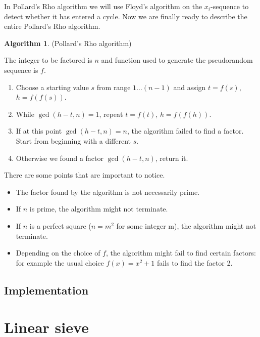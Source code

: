 \documentclass[12pt] {article}
\theoremstyle{plain}
\theoremstyle{definition}
\newtheorem{algo}[thm]{Algorithm}
\begin{document}
In Pollard's Rho algorithm we will use Floyd's algorithm on the $x_i$-sequence to detect whether it has entered a cycle. Now we are finally ready to describe the entire Pollard's Rho algorithm.

\begin{algo} (Pollard's Rho algorithm)

The integer to be factored is $n$ and function used to generate the pseudorandom sequence is $f$.
\begin{enumerate}
\item Choose a starting value $s$ from range $1 \dots (n-1)$ and assign $t = f(s)$, $h = f(f(s))$.
\item While $\gcd(h-t, n) = 1$, repeat $t = f(t)$, $h = f(f(h))$.
\item If at this point $\gcd(h-t, n) = n$, the algorithm failed to find a factor. Start from beginning with a different $s$.
\item Otherwise we found a factor $\gcd(h-t, n)$, return it.
\end{enumerate}
\end{algo}

There are some points that are important to notice.

\begin{itemize}
\item The factor found by the algorithm is not necessarily prime.
\item If $n$ is prime, the algorithm might not terminate.
\item If $n$ is a perfect square ($n = m^2$ for some integer m), the algorithm might not terminate.
\item Depending on the choice of $f$, the algorithm might fail to find certain factors: for example the usual choice $f(x) = x^2 + 1$ fails to find the factor 2\cite{pollardfail}.
\end{itemize}

\subsection {Implementation}



\section {Linear sieve}

\printbibliography
\end{document}
